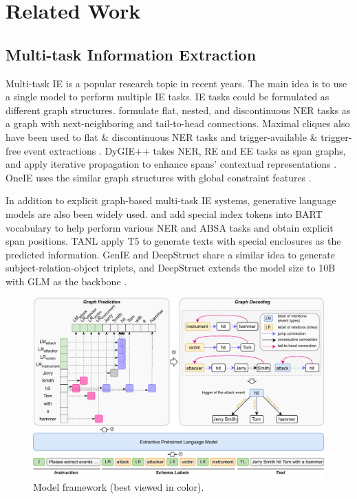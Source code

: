 \section{Related Work}

\subsection{Multi-task Information Extraction}

Multi-task IE is a popular research topic in recent years.
The main idea is to use a single model to perform multiple IE tasks.
IE tasks could be formulated as different graph structures.
\citet{w2ner} formulate flat, nested, and discontinuous NER tasks as a graph with next-neighboring and tail-to-head connections.
Maximal cliques also have been used to flat \& discontinuous NER tasks \cite{mac-discontinuous-ner} and trigger-available \& trigger-free event extractions \cite{ptpcg}.
DyGIE++ takes NER, RE and EE tasks as span graphs, and apply iterative propagation to enhance spans' contextual representations \cite{dygiepp}.
OneIE uses the similar graph structures with global constraint features \cite{oneie}.

In addition to explicit graph-based multi-task IE systems, generative language models are also been widely used.
\citet{bart-ner} and \citet{bart-absa} add special index tokens into BART \cite{bart} vocabulary to help perform various NER and ABSA tasks and obtain explicit span positions.
TANL \cite{tanl} apply T5 \cite{t5} to generate texts with special enclosures as the predicted information.
GenIE \cite{genie} and DeepStruct \cite{deepstruct} share a similar idea to generate subject-relation-object triplets, and DeepStruct extends the model size to 10B with GLM as the backbone \cite{glm}.


\begin{figure}[t]
    \centering
    \includegraphics[width=\textwidth]{figs/Model Framework.pdf}
    \caption{Model framework (best viewed in color).}
    \label{fig:model-framework}
\end{figure}

